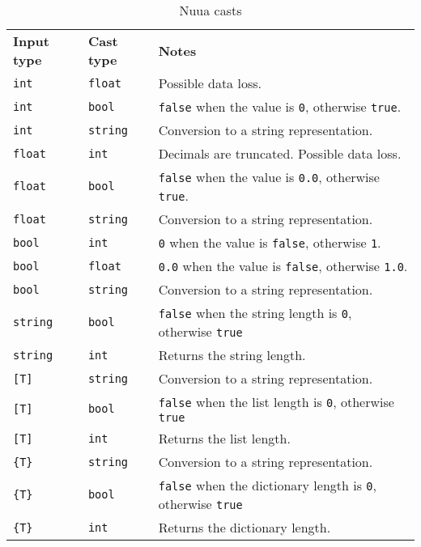 \begin{table}[H]
    \centering
    \begin{tabular}{ l l p{9.5cm} }
        \textbf{Input type} & \textbf{Cast type} & \textbf{Notes} \\
        \texttt{int} & \texttt{float} & Possible data loss.\\
        \texttt{int} & \texttt{bool} & \texttt{false} when the value is \texttt{0}, otherwise \texttt{true}.\\
        \texttt{int} & \texttt{string} & Conversion to a string representation.\\
        \texttt{float} & \texttt{int} & Decimals are truncated. Possible data loss.\\
        \texttt{float} & \texttt{bool} & \texttt{false} when the value is \texttt{0.0}, otherwise \texttt{true}.\\
        \texttt{float} & \texttt{string} & Conversion to a string representation.\\
        \texttt{bool} & \texttt{int} & \texttt{0} when the value is \texttt{false}, otherwise \texttt{1}.\\
        \texttt{bool} & \texttt{float} & \texttt{0.0} when the value is \texttt{false}, otherwise \texttt{1.0}.\\
        \texttt{bool} & \texttt{string} & Conversion to a string representation.\\
        \texttt{string} & \texttt{bool} & \texttt{false} when the string length is \texttt{0}, otherwise \texttt{true}\\
        \texttt{string} & \texttt{int} & Returns the string length.\\
        \texttt{[T]} & \texttt{string} & Conversion to a string representation.\\
        \texttt{[T]} & \texttt{bool} & \texttt{false} when the list length is \texttt{0}, otherwise \texttt{true}\\
        \texttt{[T]} & \texttt{int} & Returns the list length.\\
        \texttt{\{T\}} & \texttt{string} & Conversion to a string representation.\\
        \texttt{\{T\}} & \texttt{bool} & \texttt{false} when the dictionary length is \texttt{0}, otherwise \texttt{true}\\
        \texttt{\{T\}} & \texttt{int} & Returns the dictionary length.\\
    \end{tabular}
    \caption{Nuua casts}
    \label{fig:nuua_casts}
\end{table}

